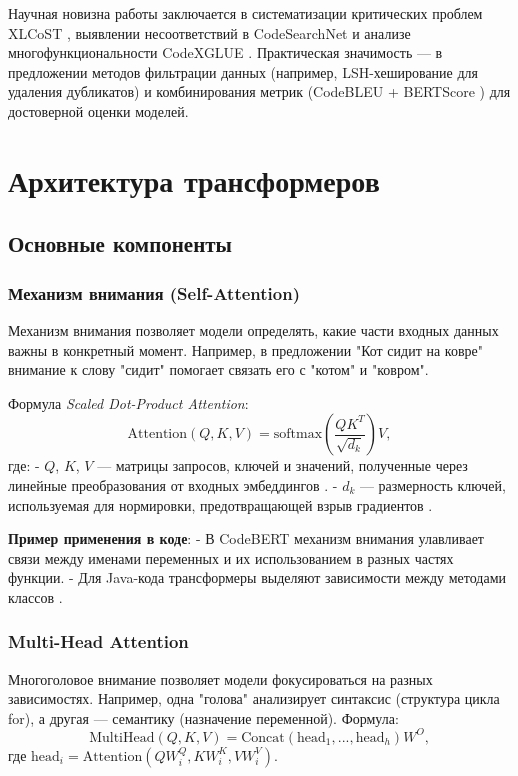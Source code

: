 \documentclass[14pt]{article}
\theoremstyle{definition}
\begin{document}
Научная новизна работы заключается в систематизации критических проблем XLCoST \cite{zhu2022}, выявлении несоответствий в CodeSearchNet \cite{husain2019codesearchnet} и анализе многофункциональности CodeXGLUE \cite{lu2021codexglue}. Практическая значимость — в предложении методов фильтрации данных (например, LSH-хеширование для удаления дубликатов) и комбинирования метрик (CodeBLEU + BERTScore \cite{zhang2020}) для достоверной оценки моделей.



\newpage
\section{Архитектура трансформеров}
\subsection{Основные компоненты}
\subsubsection{Механизм внимания (Self-Attention)}
Механизм внимания позволяет модели определять, какие части входных данных важны в конкретный момент. Например, в предложении "Кот сидит на ковре" внимание к слову "сидит" помогает связать его с "котом" и "ковром".

Формула \textit{Scaled Dot-Product Attention}:
\[
\text{Attention}(Q, K, V) = \text{softmax}\left(\frac{QK^T}{\sqrt{d_k}}\right)V,
\]
где:
- \(Q\), \(K\), \(V\) — матрицы запросов, ключей и значений, полученные через линейные преобразования от входных эмбеддингов \cite{vaswani2017attention}.
- \(d_k\) — размерность ключей, используемая для нормировки, предотвращающей взрыв градиентов \cite{chen2023}.

\textbf{Пример применения в коде}: 
- В CodeBERT \cite{feng2020codebert} механизм внимания улавливает связи между именами переменных и их использованием в разных частях функции.
- Для Java-кода трансформеры выделяют зависимости между методами классов \cite{feng2023}.

\subsubsection{Multi-Head Attention}
Многоголовое внимание позволяет модели фокусироваться на разных зависимостях. Например, одна "голова" анализирует синтаксис (структура цикла for), а другая — семантику (назначение переменной). Формула:
\[
\text{MultiHead}(Q, K, V) = \text{Concat}(\text{head}_1, ..., \text{head}_h)W^O,
\]
где \(\text{head}_i = \text{Attention}(QW_i^Q, KW_i^K, VW_i^V)\).
\end{document}

